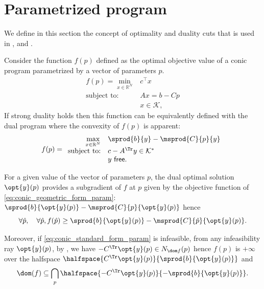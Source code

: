 \documentclass[11pt,twoside,a4paper,openright]{uclouvain-thesis}
\begin{document}
\section{Parametrized program}
\label{sec:ddp}

We define in this section the concept of optimality and duality cuts that
is used in ,  and .

Consider the function $f(p)$
defined as the optimal objective value of a conic program
parametrized by a vector of parameters $p$.
\begin{equation}\label{eq:conic_standard_form_param}
    \begin{array}{rl}
      f(p) = \min\limits_{x\in\mathbb{R}^N} & c^\top x\\
      \text{subject to:} & Ax = b - Cp\\
                         & x \in \mathcal{K},
    \end{array}
\end{equation}
If strong duality holds then this function can be equivalently
defined with the dual program where the convexity of $f(p)$ is apparent:
\begin{equation}\label{eq:conic_geometric_form_param}
  f(p) = \begin{array}{rl}
      \max\limits_{x\in\mathbb{R}^N} & \sprod{b}{y} - \msprod{C}{p}{y}\\
      \text{subject to:} & c - A^\Tr y \in \mathcal{K}^*\\
                         & y\ \mathsf{free}.
  \end{array}
\end{equation}

For a given value of the vector of parameters $p$, the
dual optimal solution $\opt{y}(p)$ provides a subgradient of $f$ at $p$ given
by the objective function of \eqref{eq:conic_geometric_form_param}:
$\sprod{b}{\opt{y}(p)} - \msprod{C}{p}{\opt{y}(p)}$ hence
\begin{equation}
  \label{eq:opticut}
  \forall \hat{p}, \quad \forall \hat{p}, f(\hat{p}) \ge \sprod{b}{\opt{y}(p)} - \msprod{C}{\hat{p}}{\opt{y}(p)}.
\end{equation}

Moreover, if \eqref{eq:conic_standard_form_param} is infeasible,
from any infeasibility ray $\opt{y}(p)$, by ,
we have $-C^\Tr \opt{y}(p) \in N_{\dom f}(p)$ hence
$f(p)$ is $+\infty$ over the halfspace
$\halfspace{C^\Tr \opt{y}(p)}{\sprod{b}{\opt{y}(p)}}$ and
\begin{equation}
  \label{eq:infcut}
  \dom(f) \subseteq \bigcap_{p} \halfspace{-C^\Tr \opt{y}(p)}{-\sprod{b}{\opt{y}(p)}}.
\end{equation}
\end{document}
